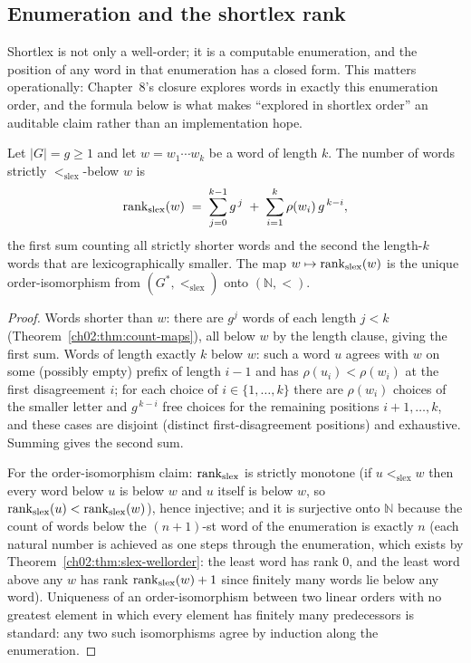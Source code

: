 \subsection{Enumeration and the shortlex rank}

Shortlex is not only a well-order; it is a computable enumeration, and
the position of any word in that enumeration has a closed form. This
matters operationally: Chapter~8's closure explores words in exactly this
enumeration order, and the formula below is what makes ``explored in
shortlex order'' an auditable claim rather than an implementation hope.

\begin{proposition}\label{ch02:prop:slex-rank}
Let $|G| = g \geq 1$ and let $w = w_1 \cdots w_k$ be a word of length
$k$. The number of words strictly $<_{\mathrm{slex}}$-below $w$ is
\[
\mathrm{rank}_{\mathrm{slex}}(w) \;=\; \sum_{j=0}^{k-1} g^{\,j}
\;+\; \sum_{i=1}^{k} \rho(w_i)\, g^{\,k-i},
\]
the first sum counting all strictly shorter words and the second the
length-$k$ words that are lexicographically smaller. The map
$w \mapsto \mathrm{rank}_{\mathrm{slex}}(w)$ is the unique order-isomorphism from
$(G^{*}, <_{\mathrm{slex}})$ onto $(\mathbb{N}, <)$.
\end{proposition}

\begin{proof}
Words shorter than $w$: there are $g^{j}$ words of each length
$j < k$ (Theorem~\ref{ch02:thm:count-maps}), all below $w$ by the
length clause, giving the first sum. Words of length exactly $k$ below
$w$: such a word $u$ agrees with $w$ on some (possibly empty) prefix of
length $i - 1$ and has $\rho(u_i) < \rho(w_i)$ at the first
disagreement $i$; for each choice of $i \in \{1, \dots, k\}$ there are
$\rho(w_i)$ choices of the smaller letter and $g^{\,k-i}$ free choices
for the remaining positions $i+1, \dots, k$, and these cases are
disjoint (distinct first-disagreement positions) and exhaustive. Summing
gives the second sum.

For the order-isomorphism claim: $\mathrm{rank}_{\mathrm{slex}}$ is strictly
monotone (if $u <_{\mathrm{slex}} w$ then every word below $u$ is below
$w$ and $u$ itself is below $w$, so
$\mathrm{rank}_{\mathrm{slex}}(u) < \mathrm{rank}_{\mathrm{slex}}(w)$), hence injective;
and it is surjective onto $\mathbb{N}$ because the count of words below
the $(n+1)$-st word of the enumeration is exactly $n$ (each natural
number is achieved as one steps through the enumeration, which exists by
Theorem~\ref{ch02:thm:slex-wellorder}: the least word has rank $0$, and
the least word above any $w$ has rank $\mathrm{rank}_{\mathrm{slex}}(w) + 1$
since finitely many words lie below any word). Uniqueness of an
order-isomorphism between two linear orders with no greatest element in
which every element has finitely many predecessors is standard: any two
such isomorphisms agree by induction along the enumeration.
\end{proof}

